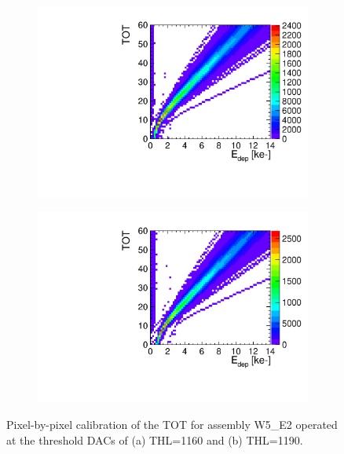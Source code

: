 \begin{figure}[htbp] \centering
  \begin{subfigure}[b]{0.45\textwidth}
    \includegraphics[width=\textwidth]{./figures/Calibration/TOTcalibration_W0005_E02_thresh1160.pdf}
    \caption{}
  \end{subfigure} \hfill
  \begin{subfigure}[b]{0.45\textwidth}
    \includegraphics[width=\textwidth]{./figures/Calibration/TOTcalibration_W0005_E02_thresh1190.pdf}
    \caption{}
  \end{subfigure}
  \caption{Pixel-by-pixel calibration of the TOT for assembly W5\_E2
    operated at the threshold DACs of (a) THL=1160 and (b) THL=1190.}
  \label{fig:TOTcalib_55GNDGR100}
\end{figure}

